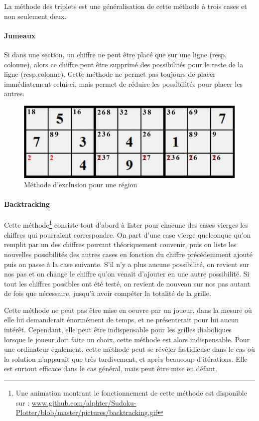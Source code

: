 \documentclass[12pt,a4paper]{report}
\begin{document}
La méthode des triplets est une généralisation de cette méthode à trois cases et non seulement deux.

\paragraph{Jumeaux} Si dans une section, un chiffre ne peut être placé que sur une ligne (resp. colonne), alors ce chiffre peut être supprimé des possibilités pour le reste de la ligne (resp.colonne). Cette méthode ne permet pas toujours de placer immédiatement celui-ci, mais permet de réduire les possibilités pour placer les autres.
\begin{figure}[!h]
 \center
 \includegraphics[scale=0.8]{../pictures/jumeaux}
 \caption{Méthode d'exclusion pour une région}
\end{figure}

\paragraph{Backtracking} Cette méthode\footnote{Une animation montrant le fonctionnement de cette méthode est disponible sur : \url{www.github.com/alphter/Sudoku-Plotter/blob/master/pictures/backtracking.gif}} consiste tout d'abord à lister pour chacune des cases vierges les chiffres qui pourraient correspondre. On part d'une case vierge quelconque qu'on remplit par un des chiffres pouvant théoriquement convenir, puis on liste les nouvelles possibilités des autres cases en fonction du chiffre précédemment ajouté puis on passe à la case suivante. S'il n'y a plus aucune possibilité, on revient sur nos pas et on change le chiffre qu'on venait d'ajouter en une autre possibilité. Si tout les chiffres possibles ont été testé, on revient de nouveau sur nos pas autant de fois que nécessaire, jusqu'à avoir compéter la totalité de la grille. 

Cette méthode ne peut pas être mise en oeuvre par un joueur, dans la mesure où elle lui demanderait énormément de temps, et ne présenterait pour lui aucun intérêt. Cependant, elle peut être indispensable pour les grilles diaboliques lorsque le joueur doit faire un choix, cette méthode est alors indispensable.
Pour une ordinateur également, cette méthode peut se révéler fastidieuse dans le cas où la solution n'apparait que très tardivement, et après beaucoup d'itérations. Elle est surtout efficace dans le cas général, mais peut être mise en défaut.
\end{document}
